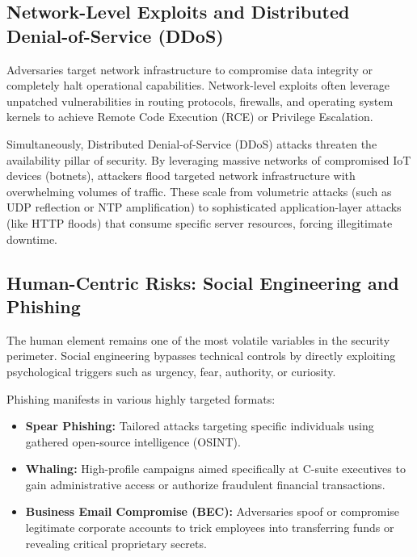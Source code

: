 \documentclass[11pt,a4paper]{article}
\begin{document}
\subsection{Network-Level Exploits and Distributed Denial-of-Service (DDoS)}
Adversaries target network infrastructure to compromise data integrity or completely halt operational capabilities. Network-level exploits often leverage unpatched vulnerabilities in routing protocols, firewalls, and operating system kernels to achieve Remote Code Execution (RCE) or Privilege Escalation.
\vspace{1em}

Simultaneously, Distributed Denial-of-Service (DDoS) attacks threaten the availability pillar of security. By leveraging massive networks of compromised IoT devices (botnets), attackers flood targeted network infrastructure with overwhelming volumes of traffic. These scale from volumetric attacks (such as UDP reflection or NTP amplification) to sophisticated application-layer attacks (like HTTP floods) that consume specific server resources, forcing illegitimate downtime.

\subsection{Human-Centric Risks: Social Engineering and Phishing}
The human element remains one of the most volatile variables in the security perimeter. Social engineering bypasses technical controls by directly exploiting psychological triggers such as urgency, fear, authority, or curiosity.

Phishing manifests in various highly targeted formats:

\begin{itemize}
    \item \textbf{Spear Phishing:} Tailored attacks targeting specific individuals using gathered open-source intelligence (OSINT).

    \item \textbf{Whaling:} High-profile campaigns aimed specifically at C-suite executives to gain administrative access or authorize fraudulent financial transactions.

    \item \textbf{Business Email Compromise (BEC):} Adversaries spoof or compromise legitimate corporate accounts to trick employees into transferring funds or revealing critical proprietary secrets.
\end{itemize}
\end{document}
